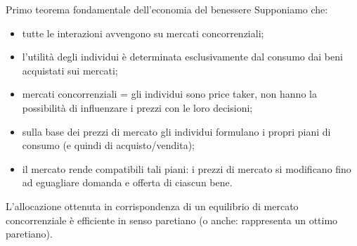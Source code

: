 \documentclass[aspectratio=64,11pt]{beamer}
\begin{document}
\begin{frame}{Primo teorema fondamentale dell’economia del benessere}
Supponiamo che:
\begin{itemize}
\item tutte le interazioni avvengono su mercati concorrenziali;
\item l’utilità degli individui è determinata esclusivamente dal consumo dai beni
acquistati sui mercati;
\item mercati concorrenziali = gli individui sono price taker, non hanno la
possibilità di influenzare i prezzi con le loro decisioni;
\item sulla base dei prezzi di mercato gli individui formulano i propri piani di
consumo (e quindi di acquisto/vendita);
\item il mercato rende compatibili tali piani: i prezzi di mercato si modificano
fino ad eguagliare domanda e offerta di ciascun bene.
\end{itemize}
\begin{block}{}
L’allocazione ottenuta in corrispondenza di un equilibrio di mercato concorrenziale è efficiente in senso paretiano (o anche: rappresenta un ottimo paretiano).
\end{block}
\end{frame}
\end{document}

